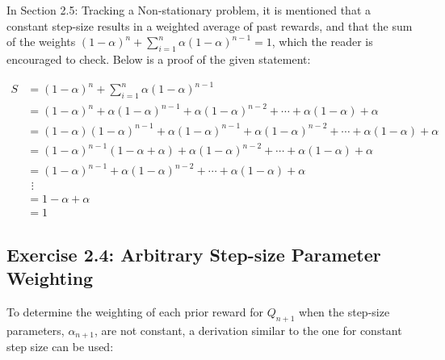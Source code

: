 \begin{tcolorbox}
In Section 2.5: Tracking a Non-stationary problem, it is mentioned that a constant step-size results in a weighted average of past rewards, and that the sum of the weights $(1-\alpha)^n + \sum_{i=1}^{n} \alpha(1-\alpha)^{n-1}=1$, which the reader is encouraged to check. Below is a proof of the given statement: 

\vspace{-6mm}
\begin{align*}
S &= (1-\alpha)^n + \sum_{i=1}^{n} \alpha(1-\alpha)^{n-1}  \\
&= (1-\alpha)^n + \alpha(1-\alpha)^{n-1} + \alpha(1-\alpha)^{n-2} + \cdots + \alpha(1-\alpha) + \alpha \\
&= (1-\alpha)(1-\alpha)^{n-1} + \alpha(1-\alpha)^{n-1} + \alpha(1-\alpha)^{n-2} + \cdots + \alpha(1-\alpha) + \alpha \\
&= (1-\alpha)^{n-1}(1-\alpha+\alpha) + \alpha(1-\alpha)^{n-2} + \cdots + \alpha(1-\alpha) + \alpha \\
&= (1-\alpha)^{n-1} + \alpha(1-\alpha)^{n-2} + \cdots + \alpha(1-\alpha) + \alpha \\
& \ \, \vdots \\
&= 1-\alpha+\alpha \\
&=1
\end{align*}

\end{tcolorbox}

\subsection*{Exercise 2.4: Arbitrary Step-size Parameter Weighting}

To determine the weighting of each prior reward for $Q_{n+1}$ when the step-size parameters, $\alpha_{n+1}$, are not constant, a derivation similar to the one for constant step size can be used:

